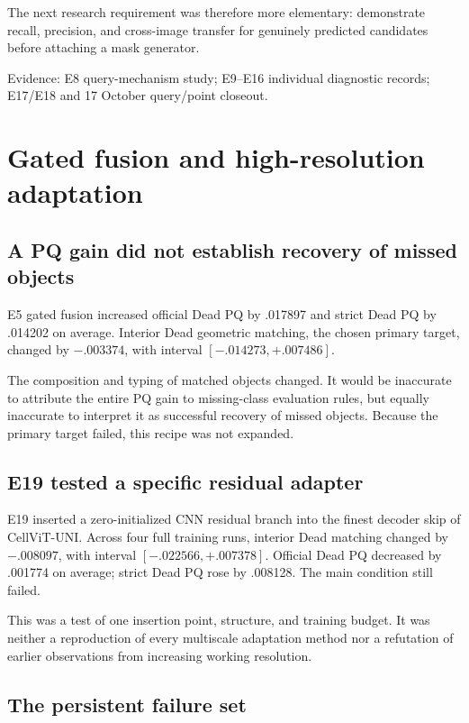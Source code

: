 \documentclass[11pt,a4paper]{article}
\newcommand{\src}[1]{\par{\footnotesize\color{gray}Evidence: #1}\par}
\begin{document}
The next research requirement was therefore more elementary: demonstrate recall, precision, and cross-image transfer for genuinely predicted candidates before attaching a mask generator.

\src{E8 query-mechanism study; E9--E16 individual diagnostic records; E17/E18 and 17 October query/point closeout.}

\section{Gated fusion and high-resolution adaptation}

\subsection{A PQ gain did not establish recovery of missed objects}

E5 gated fusion increased official Dead PQ by .017897 and strict Dead PQ by .014202 on average. Interior Dead geometric matching, the chosen primary target, changed by $-.003374$, with interval $[-.014273,+.007486]$.

The composition and typing of matched objects changed. It would be inaccurate to attribute the entire PQ gain to missing-class evaluation rules, but equally inaccurate to interpret it as successful recovery of missed objects. Because the primary target failed, this recipe was not expanded.

\subsection{E19 tested a specific residual adapter}

E19 inserted a zero-initialized CNN residual branch into the finest decoder skip of CellViT-UNI. Across four full training runs, interior Dead matching changed by $-.008097$, with interval $[-.022566,+.007378]$. Official Dead PQ decreased by .001774 on average; strict Dead PQ rose by .008128. The main condition still failed.

This was a test of one insertion point, structure, and training budget. It was neither a reproduction of every multiscale adaptation method nor a refutation of earlier observations from increasing working resolution.

\subsection{The persistent failure set}
\end{document}
